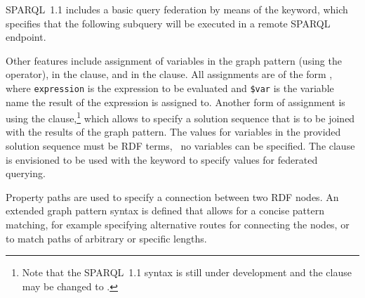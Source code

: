 %
SPARQL~1.1 includes a basic query federation by means of the  keyword, which specifies that the
following subquery will be executed in a remote SPARQL endpoint.

Other features include assignment of variables in the graph pattern (using the  operator), in the \SELECT
clause, and in the \GROUPBY clause.  All assignments are of the form
%
,
% 
where \lstinline[basicstyle=\small\ttfamily]{expression} is the expression to be evaluated and
%
\lstinline[basicstyle=\small\ttfamily]{$var}
%
is the variable name the result of the expression is assigned to.
%
Another form of assignment is using the  clause,\footnote{Note that the SPARQL~1.1 syntax is still
  under development and the  clause may be changed to .}
which allows to specify a solution sequence that is to be joined with the results of the graph pattern.  The values for
variables in the provided solution sequence must be \ac{RDF} terms, \ie~no variables can be specified.  The
 clause is envisioned to be used with the  keyword to specify values for federated
querying.


Property paths are used to specify a connection between two \ac{RDF} nodes.  An extended graph pattern syntax is defined
that allows for a concise pattern matching, for example specifying alternative routes for connecting the nodes, or to
match paths of arbitrary or specific lengths.





